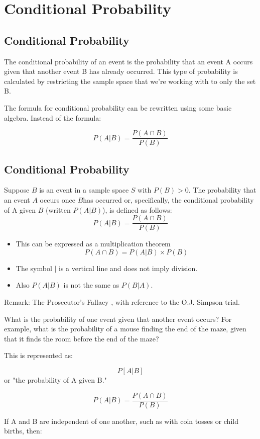 \documentclass[]{report}
\begin{document}
\chapter{Conditional Probability}
\section{Conditional Probability}

The conditional probability of an event is the probability that an event A occurs given that another event B has already occurred. This type of probability is calculated by restricting the sample space that we’re working with to only the set B.

The formula for conditional probability can be rewritten using some basic algebra. Instead of the formula:

\[P(A | B) = \frac{P(A \cap B) }{P( B )}  \]


\section{Conditional Probability}
Suppose $B$ is an event in a sample space $S$ with $P(B) > 0$.
The probability that an event $A$ occurs once $B$has occurred or, specifically, the
conditional probability of A given $B$ (written $P(A|B)$), is defined as follows:
\[ P(A|B) = \frac{P(A\cap B)}{P(B)}\]

\begin{itemize}
\item This can be expressed as a multiplication theorem
\[ P(A\cap B) = P(A|B)\times P(B) \]
\item The symbol $|$ is a vertical line and does not imply division.
\item Also $P(A|B)$ is not the same as $P(B|A)$.
\end{itemize}
Remark: The Prosecutor's Fallacy , with reference to the O.J. Simpson trial.


What is the probability of one event given that another event occurs? For example, what is the probability of a mouse finding the end of the maze, given that it finds the room before the end of the maze?

This is represented as:


\[P[A | B]\]
or "the probability of A given B."

\[P(A | B) = \frac{P(A\cap B)}{P(B)}\]

If A and B are independent of one another, such as with coin tosses or child births, then:
\end{document}
